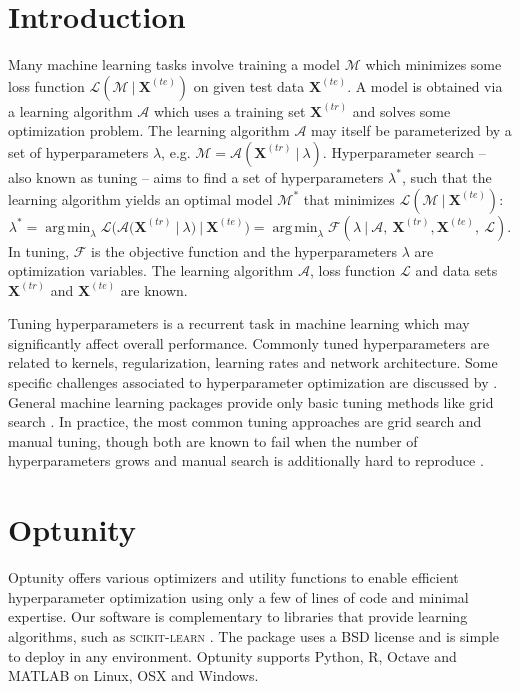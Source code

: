 \documentclass[twoside,11pt]{article}
\newcommand{\train}{\mathbf{X}^{(tr)}}
\newcommand{\test}{\mathbf{X}^{(te)}}
\newcommand{\obj}{\mathcal{F}}
\DeclareMathOperator*{\argmin}{arg\,min}
\newcommand{\optunity}{{\sc Optunity}\xspace}
\begin{document}
\section{Introduction}
Many machine learning tasks involve training a model $\mathcal{M}$ which minimizes some loss function $\mathcal{L}(\mathcal{M}\ |\ \test)$ on given test data $\test$. A model is obtained via a learning algorithm $\mathcal{A}$ which uses a training set $\train$ and solves some optimization problem. The learning algorithm $\mathcal{A}$ may itself be parameterized by a set of hyperparameters $\lambda$, e.g. $\mathcal{M} = \mathcal{A}(\train\ |\ \lambda)$.  Hyperparameter search -- also known as tuning -- aims to find a set of hyperparameters $\lambda^*$, such that the learning algorithm yields an optimal model $\mathcal{M}^*$ that minimizes $\mathcal{L}(\mathcal{M}\ |\ \test)$:
\begin{equation}
\lambda^* = \argmin_{\lambda} \mathcal{L}\big(\mathcal{A}(\train\ |\ \lambda)\ |\ \test\big) = \argmin_{\lambda} \obj(\lambda\ |\ \mathcal{A},\ \train, \test,\ \mathcal{L}). \label{equation}
\end{equation}
In tuning, $\obj$ is the objective function and the hyperparameters $\lambda$ are optimization variables. The learning algorithm $\mathcal{A}$, loss function $\mathcal{L}$ and data sets $\train$ and $\test$ are known. %

Tuning hyperparameters is a recurrent task in machine learning which may significantly affect overall performance. Commonly tuned hyperparameters are related to kernels, regularization, learning rates and network architecture. Some specific challenges associated to hyperparameter optimization are discussed by \citet{claesen2015hyperparameter}. General machine learning packages provide only basic tuning methods like grid search \citep{pedregosa2011scikit}. In practice, the most common tuning approaches are grid search and manual tuning, though both are known to fail when the number of hyperparameters grows and manual search is additionally hard to reproduce \citep{bergstra2012random}.

\section{Optunity}
\optunity offers various optimizers and utility functions to enable efficient hyperparameter optimization using only a few of lines of code and minimal expertise. Our software is complementary to libraries that provide learning algorithms, such as \textsc{scikit-learn} \citep{pedregosa2011scikit}. The package uses a BSD license and is simple to deploy in any environment. \optunity supports Python, R, Octave and MATLAB on Linux, OSX and Windows.
\end{document}
